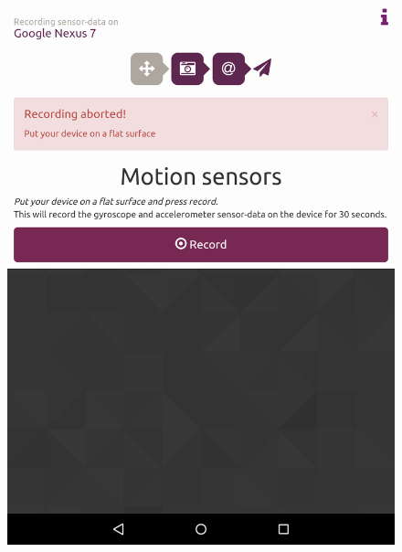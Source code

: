\begin{figure}[!htb]
  \hspace{-2cm}
  \centering
  \begin{minipage}[c]{.23\textwidth}
    \centering
    \includegraphics[scale=0.15]{img/sensorrec-nexus-2-notRec}
  \end{minipage}
  \hspace{2cm}
  \begin{minipage}[c]{.23\textwidth}
    \centering

\end{minipage}
\end{figure}
